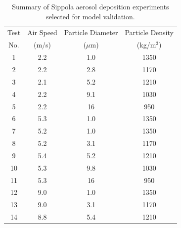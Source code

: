 \begin{table}[h]
\caption[Summary of Sippola aerosol deposition experiments selected for model validation]{Summary of Sippola aerosol deposition experiments selected for model validation.}
\begin{center}
\begin{tabular}{|c|c|c|c|}
\hline
Test      &  Air Speed        &  Particle Diameter          &  Particle Density             \\
No.       &  (m/s)            &  ($\mu$m)                   &  (kg/m$^3$)                   \\ \hline \hline
1         &  2.2              &  1.0                        &  1350                         \\ \hline
2         &  2.2              &  2.8                        &  1170                         \\ \hline
3         &  2.1              &  5.2                        &  1210                         \\ \hline
4         &  2.2              &  9.1                        &  1030                         \\ \hline
5         &  2.2              &  16                         &  950                          \\ \hline
6         &  5.3              &  1.0                        &  1350                         \\ \hline
7         &  5.2              &  1.0                        &  1350                         \\ \hline
8         &  5.2              &  3.1                        &  1170                         \\ \hline
9         &  5.4              &  5.2                        &  1210                         \\ \hline
10        &  5.3              &  9.8                        &  1030                         \\ \hline
11        &  5.3              &  16                         &  950                          \\ \hline
12        &  9.0              &  1.0                        &  1350                         \\ \hline
13        &  9.0              &  3.1                        &  1170                         \\ \hline
14        &  8.8              &  5.4                        &  1210                         \\ \hline

\end{tabular}
\end{center}
\end{table}
